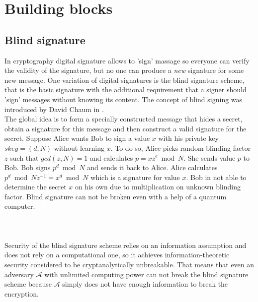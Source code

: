 \section{Building blocks}
\subsection{Blind signature}
In cryptography digital signature allows to 'sign' massage so everyone can verify the validity of the signature, but no one can  produce a \textit{new} signature for some new message. One variation of digital signatures is the blind signature scheme, that is the basic signature with the additional requirement that a signer should 'sign' messages without knowing its content. The concept of blind signing was introduced by David Chaum in \cite{Chaum1982}. \\

The global idea is to form a specially constructed message that hides a secret, obtain a signature for this message and then construct a valid signature for the secret. Suppose Alice wants Bob to sign a value $x$ with his private key $skey = (d,N)$ without learning $x$. To do so, Alice picks random blinding factor $z$ such that  $gcd(z,N) = 1$ and calculates $p=xz^e\bmod N $. She sends value $p$ to Bob. Bob signs $p^d\bmod N$ and sends it back to Alice. Alice calculates $p^d\bmod N z^{-1} = x^d\bmod N$ which is a signature for value $x$. Bob in not able to determine the secret $x$ on his own due to multiplication on unknown blinding factor. Blind signature can not be broken even with a help of a quantum computer.\\\\
\\\\
Security of the blind signature scheme relies on an information assumption and does not rely on a computational one, so it achieves information-theoretic security considered to be cryptanalytically unbreakable. That means that even an adversary $\mathcal{A}$ with unlimited computing power can not break the blind signature scheme because  $\mathcal{A}$ simply does not have enough information to break the encryption.\\

